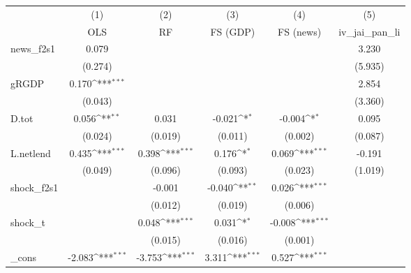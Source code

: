 {
\def\sym#1{\ifmmode^{#1}\else\(^{#1}\)\fi}
\begin{tabular}{l*{5}{c}}
\toprule
            &\multicolumn{1}{c}{(1)}&\multicolumn{1}{c}{(2)}&\multicolumn{1}{c}{(3)}&\multicolumn{1}{c}{(4)}&\multicolumn{1}{c}{(5)}\\
            &\multicolumn{1}{c}{OLS}&\multicolumn{1}{c}{RF}&\multicolumn{1}{c}{FS (GDP)}&\multicolumn{1}{c}{FS (news)}&\multicolumn{1}{c}{iv\_jai\_pan\_li}\\
\midrule
news\_f2s1   &       0.079         &                     &                     &                     &       3.230         \\
            &     (0.274)         &                     &                     &                     &     (5.935)         \\
\addlinespace
gRGDP       &       0.170\sym{***}&                     &                     &                     &       2.854         \\
            &     (0.043)         &                     &                     &                     &     (3.360)         \\
\addlinespace
D.tot       &       0.056\sym{**} &       0.031         &      -0.021\sym{*}  &      -0.004\sym{*}  &       0.095         \\
            &     (0.024)         &     (0.019)         &     (0.011)         &     (0.002)         &     (0.087)         \\
\addlinespace
L.netlend   &       0.435\sym{***}&       0.398\sym{***}&       0.176\sym{*}  &       0.069\sym{***}&      -0.191         \\
            &     (0.049)         &     (0.096)         &     (0.093)         &     (0.023)         &     (1.019)         \\
\addlinespace
shock\_f2s1  &                     &      -0.001         &      -0.040\sym{**} &       0.026\sym{***}&                     \\
            &                     &     (0.012)         &     (0.019)         &     (0.006)         &                     \\
\addlinespace
shock\_t     &                     &       0.048\sym{***}&       0.031\sym{*}  &      -0.008\sym{***}&                     \\
            &                     &     (0.015)         &     (0.016)         &     (0.001)         &                     \\
\addlinespace
\_cons      &      -2.083\sym{***}&      -3.753\sym{***}&       3.311\sym{***}&       0.527\sym{***}&                     \\

\end{tabular}}
